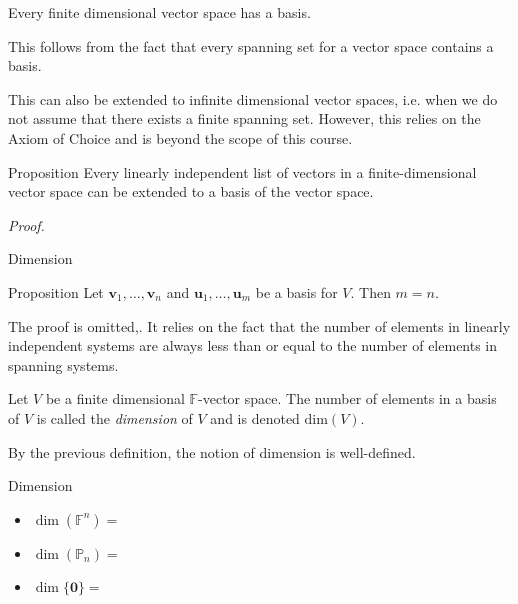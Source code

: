 \documentclass [aspectratio=169]{beamer}
\newcommand{\bu}{{\mathbf{u}}}
\newcommand{\bv}{{\mathbf{v}}}
\newcommand{\zerovec}{{\mathbf{0}}}
\newcommand{\F}{{\mathbb{F}}}
\begin{document}
\begin{frame}
\begin{corollary}
Every finite dimensional vector space has a basis.
\end{corollary}

This follows from the fact that every spanning set for a vector space contains a basis.

\vspace{1em}

This can also be extended to infinite dimensional vector spaces, i.e. when we do not assume that there exists a finite spanning set. However, this relies on the Axiom of Choice and is beyond the scope of this course.
\end{frame}

\begin{frame}
\begin{exampleblock}{Proposition}
Every linearly independent list of vectors in a finite-dimensional vector space can be extended to a basis of the vector space.
 \end{exampleblock}
\textit{Proof.}
\vspace{4cm}

\end{frame}



\begin{frame}{Dimension}
\begin{exampleblock}{Proposition}
Let $\bv_1,\ldots, \bv_n$ and $\bu_1,\ldots, \bu_m$ be a basis for $V$. Then $m=n$.
 \end{exampleblock}

The proof is omitted,. It relies on the fact that the number of elements in linearly independent systems are always less than or equal to the number of elements in spanning systems. 

\begin{definition}
Let $V$ be a finite dimensional $\F$-vector space. The number of elements in a basis of $V$ is called the \emph{dimension} of $V$ and is denoted $\mathrm{dim}(V)$.
\end{definition}

By the previous definition, the notion of dimension is well-defined. 
\end{frame}

\begin{frame}{Dimension}
\begin{example}
\begin{itemize}
      \setlength\itemsep{0.7em}
    \item $\dim(\F^n) = $
    \item $\dim(\mathbb{P}_n)= $
    \item $\dim \{ \zerovec \} = $ 
\end{itemize}
\vspace{2em}
\end{example}
\end{frame}
\end{document}
